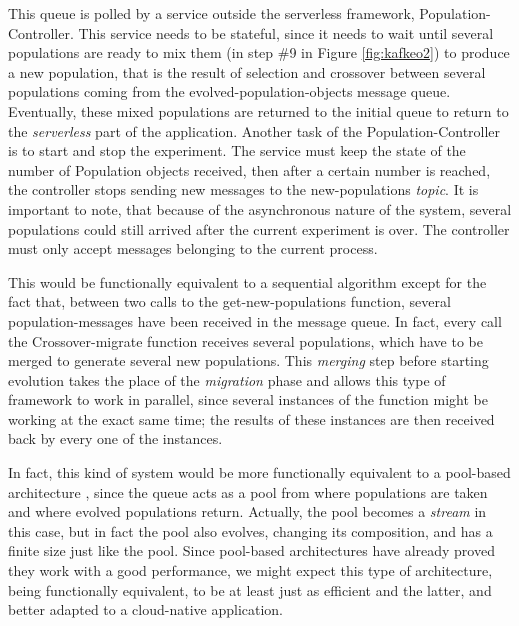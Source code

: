 \documentclass[sigconf]{acmart}
\begin{document}
This queue is polled by a service outside the serverless framework,
{\sf Population-Controller}. This service needs to be stateful, since
it needs to wait until several populations are ready to mix them (in
step \#9 in Figure \ref{fig:kafkeo2}) to produce a new population, that is the result of selection
and crossover between several populations coming from the {\sf
  evolved-population-objects} message queue. Eventually, these mixed
populations are returned to the initial queue to return to the {\em
  serverless} part of the application. Another task of the {\sf Population-Controller} is to start and stop the experiment. The service must 
  keep the state of the number of Population objects received, then after 
  a certain number is reached, the controller stops sending new messages to the 
  {\sf new-populations} {\em topic}. It is important to note, that because of
  the asynchronous nature of the system, several populations could still 
  arrived after the current experiment is over. The controller must only 
  accept messages belonging to the current process.   
  

This would be functionally equivalent to a sequential algorithm except
for the fact that, between two calls to the {\sf get-new-populations}
function, several 
population-messages have been received in the message queue. In fact,
every call the {\sf Crossover-migrate} function receives several populations, which
have to be merged to generate several new populations. This {\em merging} step
before starting evolution takes the place of the {\em migration} phase
and allows this type of framework to work in parallel, since several
instances of the function might be working at the exact same time; the
results of these instances are then received back by every one of the
instances.

In fact, this kind of system would be more functionally equivalent to
a pool-based architecture \cite{bollini1999distributed}, since the
queue acts as a pool from where populations are taken and where
evolved populations return. Actually, the pool becomes a {\em stream}
in this case, but in fact the pool also evolves, changing its
composition, and has a finite size just like the pool. Since
pool-based architectures have already proved they work with a good
performance, we might expect this type of architecture, being
functionally equivalent, to be at least just as efficient and the
latter, and better adapted to a cloud-native application.
\end{document}
